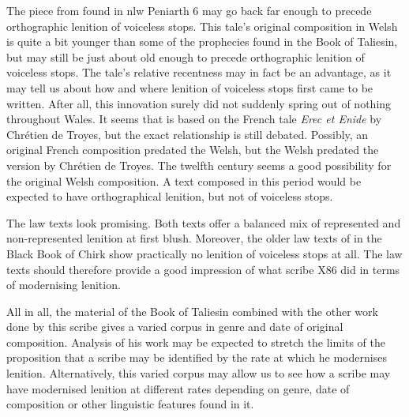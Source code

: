 The piece from  found in \gls{nlw} Peniarth 6 may go back far enough to precede orthographic lenition of voiceless stops.  This tale's original composition in Welsh is quite a bit younger than some of the prophecies found in the Book of Taliesin, but may still be just about old enough to precede orthographic lenition of voiceless stops. The tale's relative recentness may in fact be an advantage, as it may tell us about how and where lenition of voiceless stops first came to be written. After all, this innovation surely did not suddenly spring out of nothing throughout Wales. It seems that  is based on the French tale \textit{Erec et Enide} by Chrétien de Troyes, but the exact relationship is still debated. Possibly, an original French composition predated the Welsh, but the Welsh predated the version by Chrétien de Troyes. The twelfth century seems a good possibility for the original Welsh composition. A text composed in this period would be expected to have orthographical lenition, but not of voiceless stops.

The law texts look promising. Both texts offer a balanced mix of represented and non-represented lenition at first blush. Moreover, the older law texts of  in the Black Book of Chirk show practically no lenition of voiceless stops at all. The law texts should therefore provide a good impression of what scribe X86 did in terms of modernising lenition.

All in all, the material of the Book of Taliesin combined with the other work done by this scribe gives a varied corpus in genre and date of original composition. Analysis of his work may be expected to stretch the limits of the proposition that a scribe may be identified by the rate at which he modernises lenition. Alternatively, this varied corpus may allow us to see how a scribe may have modernised lenition at different rates depending on genre, date of composition or other linguistic features found in it.



